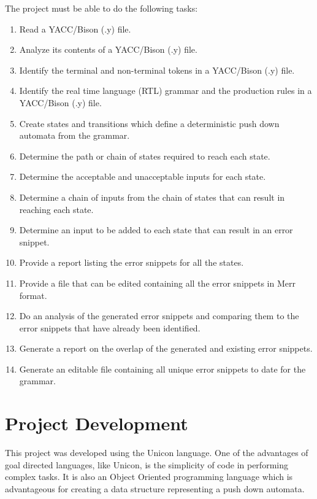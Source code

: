 \documentclass{article}
\begin{document}
The project must be able to do the following tasks:
\begin{enumerate}
\item Read a YACC/Bison (.y) file.
\item Analyze its contents of a YACC/Bison (.y) file.
\item Identify the terminal and non-terminal tokens in a YACC/Bison (.y) file.
\item Identify the real time language (RTL) grammar and the production rules in a YACC/Bison (.y) file.
\item Create states and transitions which define a deterministic push down automata from the grammar.
\item Determine the path or chain of states required to reach each state.
\item Determine the acceptable and unacceptable inputs for each state.
\item Determine a chain of inputs from the chain of states that can result in reaching each state.
\item Determine an input to be added to each state that can result in an error snippet.
\item Provide a report listing the error snippets for all the states.
\item Provide a file that can be edited containing all the error snippets in Merr format.
\item Do an analysis of the generated error snippets and comparing them to the error snippets that have already been identified.
\item Generate a report on the overlap of the generated and existing error snippets.
\item Generate an editable file containing all unique error snippets to date for the grammar.
\end{enumerate}

\section{Project Development}
This project was developed using the Unicon language.  One of the advantages of goal directed languages, like Unicon, is the simplicity of code in performing complex tasks.  It is also an Object Oriented programming language which is advantageous for creating a data structure representing a push down automata.
\end{document}
